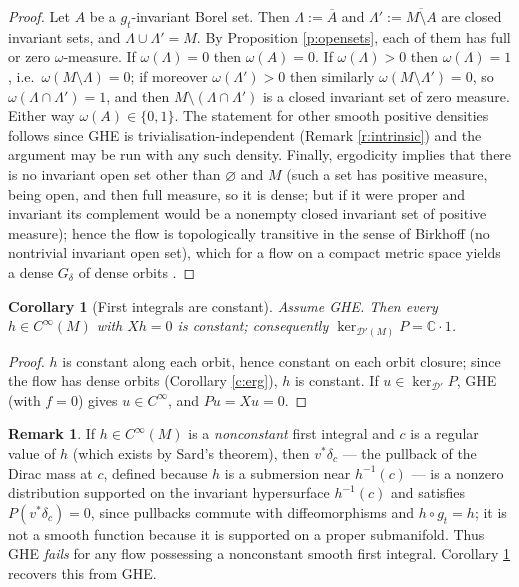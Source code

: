 \documentclass[11pt]{amsart}
\theoremstyle{plain}
\newtheorem{corollary}[theorem]{Corollary}
\theoremstyle{definition}
\newtheorem{remark}[theorem]{Remark}
\theoremstyle{remark}
\newcommand{\DD}{\mathcal{D}'}
\newcommand{\flow}{g_t}
\begin{document}
\begin{proof}
Let $A$ be a $\flow$-invariant Borel set.  Then
$\Lambda:=\overline{A}$ and $\Lambda':=\overline{M\setminus A}$ are
closed invariant sets, and $\Lambda\cup\Lambda'=M$.  By Proposition
\ref{p:opensets}, each of them has full or zero $\omega$-measure.  If
$\omega(\Lambda)=0$ then $\omega(A)=0$.  If $\omega(\Lambda)>0$ then
$\omega(\Lambda)=1$, i.e.\ $\omega(M\setminus\Lambda)=0$; if
moreover $\omega(\Lambda')>0$ then similarly $\omega(M\setminus
\Lambda')=0$, so $\omega(\Lambda\cap\Lambda')=1$, and then
$M\setminus(\Lambda\cap \Lambda')$ is a closed invariant set of zero
measure.  Either way $\omega(A)\in\{0,1\}$.  The statement for other
smooth positive densities follows since GHE is
trivialisation-independent (Remark \ref{r:intrinsic}) and the
argument may be run with any such density.  Finally, ergodicity
implies that there is no invariant open set other than
$\varnothing$ and $M$ (such a set has positive measure, being open,
and then full measure, so it is dense; but if it were proper and
invariant its complement would be a nonempty closed invariant set of
positive measure); hence the flow is topologically transitive in the
sense of Birkhoff (no nontrivial invariant open set), which for a
flow on a compact metric space yields a dense $G_\delta$ of dense
orbits \cite[Th.~1.11]{FurstenbergRec}.
\end{proof}

\begin{corollary}[First integrals are constant]\label{c:firstint}
Assume GHE.  Then every $h\in C^\infty(M)$ with $Xh=0$ is constant;
consequently $\ker_{\DD(M)} P=\mathbb{C}\cdot 1$.
\end{corollary}

\begin{proof}
$h$ is constant along each orbit, hence constant on each orbit
closure; since the flow has dense orbits (Corollary \ref{c:erg}),
$h$ is constant.  If $u\in\ker_{\DD}P$, GHE (with $f=0$) gives
$u\in C^\infty$, and $Pu=Xu=0$.
\end{proof}

\begin{remark}
If $h\in C^\infty(M)$ is a \emph{nonconstant} first integral and $c$
is a regular value of $h$ (which exists by Sard's theorem), then
$v^*\delta_c$ --- the pullback of the Dirac mass at $c$, defined
because $h$ is a submersion near $h^{-1}(c)$ --- is a nonzero
distribution supported on the invariant hypersurface $h^{-1}(c)$
and satisfies $P(v^*\delta_c)=0$, since pullbacks commute with
diffeomorphisms and $h\circ g_t=h$; it is not a smooth function
because it is supported on a proper submanifold.  Thus GHE
\emph{fails} for any flow possessing a nonconstant smooth first
integral.  Corollary \ref{c:firstint} recovers this from GHE.
\end{remark}
\end{document}
